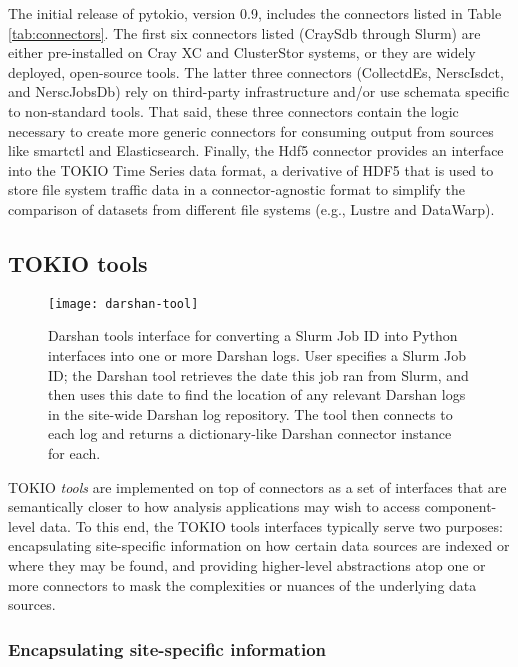 The initial release of pytokio, version 0.9, includes the connectors listed in Table \ref{tab:connectors}.
The first six connectors listed (CraySdb through Slurm) are either pre-installed on Cray XC and ClusterStor systems, or they are widely deployed, open-source tools.
The latter three connectors (CollectdEs, NerscIsdct, and NerscJobsDb) rely on third-party infrastructure and/or use schemata specific to non-standard tools.
That said, these three connectors contain the logic necessary to create more generic connectors for consuming output from sources like smartctl and Elasticsearch.
Finally, the Hdf5 connector provides an interface into the TOKIO Time Series data format, a derivative of HDF5 that is used to store file system traffic data in a connector-agnostic format to simplify the comparison of datasets from different file systems (e.g., Lustre and DataWarp).

\subsection{TOKIO tools} \label{sec:architecture/tools}

\begin{figure}[b]
    \centering
    \texttt{[image: darshan-tool]}
    \caption{Darshan tools interface for converting a Slurm Job ID into Python interfaces into one or more Darshan logs.
    User specifies a Slurm Job ID; the Darshan tool retrieves the date this job ran from Slurm, and then uses this date to find the location of any relevant Darshan logs in the site-wide Darshan log repository.
    The tool then connects to each log and returns a dictionary-like Darshan connector instance for each.}
    \label{fig:darshan-tool}
    \vspace{-.2in}
\end{figure}

TOKIO \emph{tools} are implemented on top of connectors as a set of interfaces that are semantically closer to how analysis applications may wish to access component-level data.
To this end, the TOKIO tools interfaces typically serve two purposes:
encapsulating site-specific information on how certain data sources are indexed or where they may be found, and
providing higher-level abstractions atop one or more connectors to mask the complexities or nuances of the underlying data sources.

\subsubsection{Encapsulating site-specific information}

